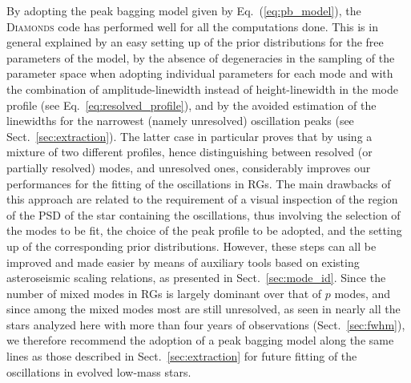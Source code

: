 \documentclass[structabstract]{aa}
\newcommand{\diamonds}{\textsc{D\large{iamonds}}}
\begin{document}
By adopting the peak bagging model given by Eq.~(\ref{eq:pb_model}), the \diamonds\,\,code has performed well for all the computations done. This is in general explained by an easy setting up of the prior distributions for the free parameters of the model, by the absence of degeneracies in the sampling of the parameter space when adopting individual parameters for each mode and with the combination of amplitude-linewidth instead of height-linewidth in the mode profile (see Eq.~\ref{eq:resolved_profile}), and by the avoided estimation of the linewidths for the narrowest (namely unresolved) oscillation peaks (see Sect.~\ref{sec:extraction}). The latter case in particular proves that by using a mixture of two different profiles, hence distinguishing between resolved (or partially resolved) modes, and unresolved ones, considerably improves our performances for the fitting of the oscillations in RGs. The main drawbacks of this approach are related to the requirement of a visual inspection of the region of the PSD of the star containing the oscillations, thus involving the selection of the modes to be fit,  the choice of the peak profile to be adopted, and the setting up of the corresponding prior distributions. However, these steps can all be improved and made easier by means of auxiliary tools based on existing asteroseismic scaling relations, as presented in Sect.~\ref{sec:mode_id}. Since the number of mixed modes in RGs is largely dominant over that of $p$ modes, and since among the mixed modes most are still unresolved, as seen in nearly all the stars analyzed here with more than four years of observations (Sect.~\ref{sec:fwhm}), we therefore recommend the adoption of a peak bagging model along the same lines as those described in Sect.~\ref{sec:extraction} for future fitting of the oscillations in evolved low-mass stars. 
\end{document}
